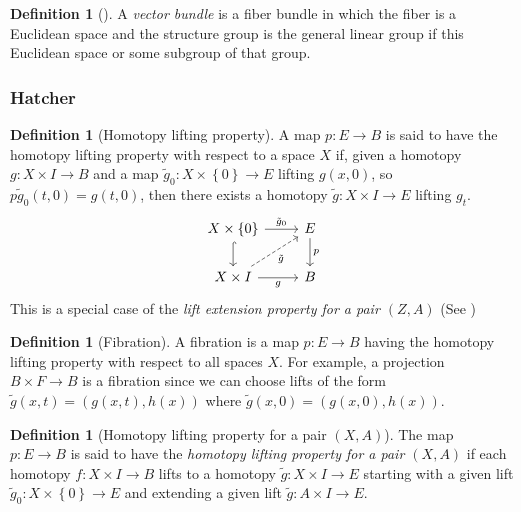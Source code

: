 \documentclass[reqno]{amsart}
\theoremstyle{definition}
\newtheorem{definition}[theorem]{Definition}
\theoremstyle{remark}
\begin{document}
\begin{definition}[]
    A \textit{vector bundle} is a fiber bundle
    in which the fiber is a Euclidean space
    and the structure group is the general linear group
    if this Euclidean space or some subgroup of that
    group.
\end{definition}

\subsubsection{Hatcher}

\begin{definition}[Homotopy lifting property]
    A map $p \colon E \to B$ is said to have the
    homotopy lifting property with respect to
    a space $X$ if, given a homotopy
    $g \colon X \times I \to B$ and a map
    $\tilde{g}_0 \colon X \times \left\{ 0 \right\}  \to E$ lifting
    $g(x,0)$, so $p \tilde{g}_0(t,0) = g(t,0)$, then
    there exists a homotopy
    $\tilde{g} \colon X \times I \to E$ lifting
    $g_t$.
    \begin{equation*}
    \begin{tikzcd}
        X \times \left\{ 0 \right\} \ar[d, hookrightarrow] 
        \ar[r, "\tilde{g}_0"] & E \ar[d, "p"] \\
        X \times I \ar[r, "g"'] \ar[ru, dashed, "\tilde{g}"'] & B
    \end{tikzcd}
    \end{equation*}
    This is a special case of the \textit{lift extension property
    for a pair $\left( Z,A \right) $} (See \cite{Munkres})
\end{definition}

\begin{definition}[Fibration]
    A fibration is a map $p \colon E \to B$ having the
    homotopy lifting property with respect to
    all spaces $X$. For example, a projection
    $B \times F \to B$ is a fibration
    since we can choose lifts of the form
    $\tilde{g}(x,t) = \left( g(x,t),h(x) \right) $ 
    where $\tilde{g}(x,0) = \left( g(x,0),h(x) \right) $.
\end{definition}

\begin{definition}[Homotopy lifting property for a pair
    $(X,A)$]
   The map $p \colon E \to B$ is said to have the
   \textit{homotopy lifting property for a pair
   $(X,A)$} if each homotopy
   $f \colon X \times I \to B$ lifts to a homotopy
   $\tilde{g} \colon X \times I \to E$ starting
   with a given lift $\tilde{g}_0 \colon 
   X \times \left\{ 0 \right\} \to E$ and
   extending a given lift 
   $\tilde{g} \colon A \times I \to E$.
\end{definition}
\end{document}
